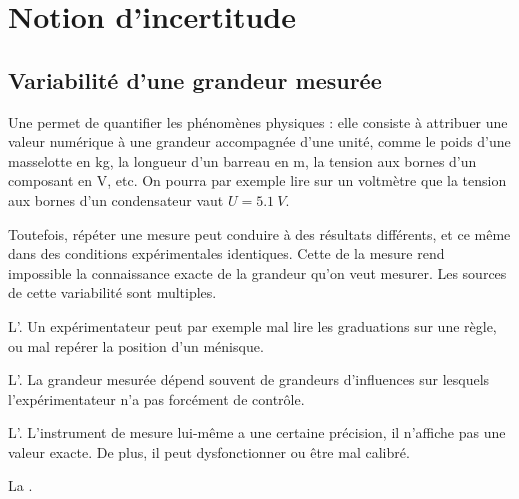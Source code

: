 

\usepackage[backend=biber, style=numeric, sorting=none]{biblatex}



\vspace{0.2cm}
\nocite{fruchart2016physique}
\nocite{jolidon_physique_2021}
\nocite{GUM}
\printbibliography[heading=custom]

\section{Notion d'incertitude}
\label{sec:definitions}
\subsection{Variabilité d’une grandeur mesurée}

Une  permet de quantifier les phénomènes physiques : elle consiste à attribuer une valeur numérique à une grandeur accompagnée d’une unité, comme le poids d’une masselotte en kg, la longueur d’un barreau en m, la tension aux bornes d’un composant en V, etc. On pourra par exemple lire sur un voltmètre que la tension aux bornes d’un condensateur vaut $U=\SI{5.1}{V}$.

Toutefois, répéter une mesure peut conduire à des résultats différents, et ce même dans des conditions expérimentales identiques. Cette  de la mesure rend impossible la connaissance exacte de la grandeur qu’on veut mesurer.  Les sources de cette variabilité sont multiples.
\begin{liste}
\item L’. Un expérimentateur peut par exemple mal lire les graduations sur une règle, ou  mal repérer la position d’un ménisque.

\item L’. La grandeur mesurée dépend souvent de grandeurs d’influences sur lesquels l’expérimentateur n’a pas forcément de contrôle.

\item L’. L’instrument de mesure lui-même a une certaine précision, il n’affiche pas une valeur exacte. De plus, il peut dysfonctionner ou être mal calibré.

\item La .

\end{liste}

